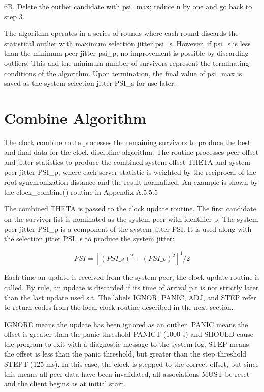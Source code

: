 6B. Delete the outlier candidate with psi\_max; reduce n by one and go
back to step 3.

The algorithm operates in a series of rounds where each round
discards the statistical outlier with maximum selection jitter psi\_s.
However, if psi\_s is less than the minimum peer jitter psi\_p, no
improvement is possible by discarding outliers.  This and the minimum
number of survivors represent the terminating conditions of the
algorithm.  Upon termination, the final value of psi\_max is saved as
the system selection jitter PSI\_s for use later.

\section{Combine Algorithm}

The clock combine route processes the remaining survivors to produce
the best and final data for the clock discipline algorithm.  The
routine processes peer offset and jitter statistics to produce the
combined system offset THETA and system peer jitter PSI\_p, where each
server statistic is weighted by the reciprocal of the root
synchronization distance and the result normalized.  An example is
shown by the clock\_combine() routine in Appendix A.5.5.5

The combined THETA is passed to the clock update routine.  The first
candidate on the survivor list is nominated as the system peer with
identifier p.  The system peer jitter PSI\_p is a component of the
system jitter PSI.  It is used along with the selection jitter PSI\_s
to produce the system jitter:

$$
PSI = [(PSI\_s)^2 + (PSI\_p)^2]^1/2
$$

Each time an update is received from the system peer, the clock
update routine is called.  By rule, an update is discarded if its
time of arrival p.t is not strictly later than the last update used
s.t.  The labels IGNOR, PANIC, ADJ, and STEP refer to return codes
from the local clock routine described in the next section.

IGNORE means the update has been ignored as an outlier.  PANIC means
the offset is greater than the panic threshold PANICT (1000 s) and
SHOULD cause the program to exit with a diagnostic message to the
system log.  STEP means the offset is less than the panic threshold,
but greater than the step threshold STEPT (125 ms).  In this case,
the clock is stepped to the correct offset, but since this means all
peer data have been invalidated, all associations MUST be reset and
the client begins as at initial start.

